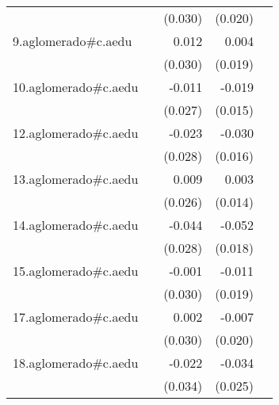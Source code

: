{\begin{longtable}{l*{4}{D{.}{.}{-1}}}
            &                     &     (0.030)         &     (0.020)         &                     \\
\addlinespace
9.aglomerado#c.aedu&                     &       0.012         &       0.004         &                     \\
            &                     &     (0.030)         &     (0.019)         &                     \\
\addlinespace
10.aglomerado#c.aedu&                     &      -0.011         &      -0.019         &                     \\
            &                     &     (0.027)         &     (0.015)         &                     \\
\addlinespace
12.aglomerado#c.aedu&                     &      -0.023         &      -0.030         &                     \\
            &                     &     (0.028)         &     (0.016)         &                     \\
\addlinespace
13.aglomerado#c.aedu&                     &       0.009         &       0.003         &                     \\
            &                     &     (0.026)         &     (0.014)         &                     \\
\addlinespace
14.aglomerado#c.aedu&                     &      -0.044         &      -0.052\sym{**} &                     \\
            &                     &     (0.028)         &     (0.018)         &                     \\
\addlinespace
15.aglomerado#c.aedu&                     &      -0.001         &      -0.011         &                     \\
            &                     &     (0.030)         &     (0.019)         &                     \\
\addlinespace
17.aglomerado#c.aedu&                     &       0.002         &      -0.007         &                     \\
            &                     &     (0.030)         &     (0.020)         &                     \\
\addlinespace
18.aglomerado#c.aedu&                     &      -0.022         &      -0.034         &                     \\
            &                     &     (0.034)         &     (0.025)         &                     \\

\end{longtable}}
